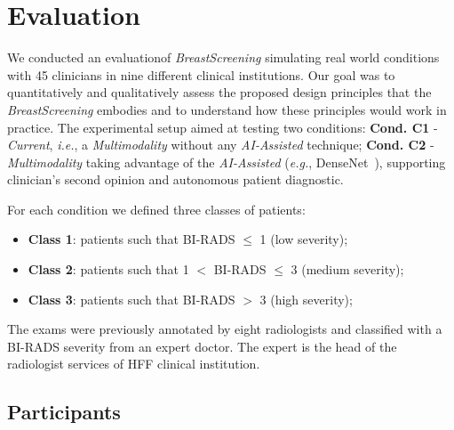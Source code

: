 \section{Evaluation}
\label{sec:methods}

We conducted an evaluation\footnotemark[5] of {\it BreastScreening} simulating real world conditions with 45 clinicians in nine different clinical institutions.
Our goal was to quantitatively and qualitatively assess the proposed design principles that the {\it BreastScreening} embodies and to understand how these principles would work in practice.
The experimental setup aimed at testing two conditions: \textbf{Cond. C1} - {\it Current}, {\it i.e.}, a {\it Multimodality} without any {\it AI-Assisted} technique; \textbf{Cond. C2} - {\it Multimodality} taking advantage of the  {\it AI-Assisted} ({\it e.g.}, DenseNet~\cite{maicas2019unsupervised}), supporting clinician's second opinion and autonomous patient diagnostic.


\noindent
For each condition we defined three classes of patients:

\begin{itemize}
\item {\bf Class 1}: patients such that BI-RADS $\leq$ 1 (low severity);
\item {\bf Class 2}: patients such that 1 $<$ BI-RADS $\leq$ 3 (medium severity);
\item {\bf Class 3}: patients such that BI-RADS $>$ 3 (high severity);
\end{itemize}

The exams were previously annotated by eight radiologists and classified with a BI-RADS severity from an expert doctor.
The expert is the head of the radiologist services of HFF clinical institution.

\subsection{Participants}
\label{sec:participants}

